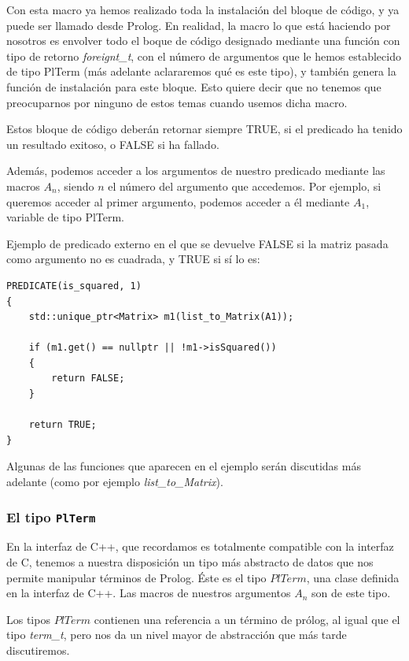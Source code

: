 \documentclass[a4paper,12pt]{article}
\begin{document}
Con esta macro ya hemos realizado toda la instalación del bloque de código, y ya puede ser llamado desde Prolog. En realidad, la macro lo que está haciendo por nosotros es envolver todo el boque de código designado mediante una función con tipo de retorno \textit{foreignt\_t}, con el número de argumentos que le hemos establecido de tipo PlTerm (más adelante aclararemos qué es este tipo), y también genera la función de instalación para este bloque. Esto quiere decir que no tenemos que preocuparnos por ninguno de estos temas cuando usemos dicha macro.

Estos bloque de código deberán retornar siempre TRUE, si el predicado ha tenido un resultado exitoso, o FALSE si ha fallado.

Además, podemos acceder a los argumentos de nuestro predicado mediante las macros $A_n$, siendo $n$ el número del argumento que accedemos. Por ejemplo, si queremos acceder al primer argumento, podemos acceder a él mediante $A_1$, variable de tipo PlTerm.

Ejemplo de predicado externo en el que se devuelve FALSE si la matriz pasada como argumento no es cuadrada, y TRUE si sí lo es:

\begin{lstlisting}[style=C++]
PREDICATE(is_squared, 1)
{
	std::unique_ptr<Matrix> m1(list_to_Matrix(A1));
	
	if (m1.get() == nullptr || !m1->isSquared())
	{
		return FALSE;
	}
	
	return TRUE;
}
\end{lstlisting}

Algunas de las funciones que aparecen en el ejemplo serán discutidas más adelante (como por ejemplo \textit{list\_to\_Matrix}).

\subsubsection{El tipo \texttt{PlTerm}}

En la interfaz de C++, que recordamos es totalmente compatible con la interfaz de C, tenemos a nuestra disposición un tipo más abstracto de datos que nos permite manipular términos de Prolog. Éste es el tipo $PlTerm$, una clase definida en la interfaz de C++. Las macros de nuestros argumentos $A_n$ son de este tipo.

Los tipos $PlTerm$ contienen una referencia a un término de prólog, al igual que el tipo \textit{term\_t}, pero nos da un nivel mayor de abstracción que más tarde discutiremos. 
\end{document}
